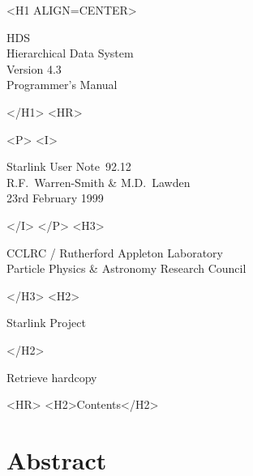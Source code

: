 \documentclass[twoside,11pt]{article}
\newcommand{\stardoccategory}  {Starlink User Note}
\newcommand{\stardocsource}    {sun\stardocnumber}
\newcommand{\stardocnumber}    {92.12}
\newcommand{\stardocauthors}   {R.F.~Warren-Smith \& M.D.~Lawden}
\newcommand{\stardocdate}      {23rd February 1999}
\newcommand{\stardoctitle}     {HDS\\ [\latex{1ex}]
                                Hierarchical Data System}
\newcommand{\stardocversion}   {Version 4.3}
\newcommand{\stardocmanual}    {Programmer's Manual}
\newcommand{\htmladdnormallink}[2]{#1}
\newcommand{\htmladdimg}[1]{}
\newcommand{\htmlref}[2]{#1}
\newcommand{\htmladdtonavigation}[1]{}
\newcommand{\latex}[1]{#1}
\newcommand{\xlabel}[1]{}
\renewcommand{\_}{\texttt{\symbol{95}}}
\begin{document}
\begin{htmlonly}
   \xlabel{}
   \begin{rawhtml} <H1 ALIGN=CENTER> \end{rawhtml}
      \stardoctitle\\
      \stardocversion\\
      \stardocmanual
   \begin{rawhtml} </H1> <HR> \end{rawhtml}


   \begin{rawhtml} <P> <I> \end{rawhtml}
   \stardoccategory\ \stardocnumber \\
   \stardocauthors \\
   \stardocdate
   \begin{rawhtml} </I> </P> <H3> \end{rawhtml}
      \htmladdnormallink{CCLRC / Rutherford Appleton Laboratory}
                        {http://www.cclrc.ac.uk} \\
      \htmladdnormallink{Particle Physics \& Astronomy Research Council}
                        {http://www.pparc.ac.uk} \\
   \begin{rawhtml} </H3> <H2> \end{rawhtml}
      \htmladdnormallink{Starlink Project}{http://www.starlink.ac.uk/}
   \begin{rawhtml} </H2> \end{rawhtml}
   \htmladdnormallink{\htmladdimg{source.gif} Retrieve hardcopy}
      {http://www.starlink.ac.uk/cgi-bin/hcserver?\stardocsource}\\

  \label{stardoccontents}
  \begin{rawhtml}
    <HR>
    <H2>Contents</H2>
  \end{rawhtml}
  \htmladdtonavigation{\htmlref{\htmladdimg{contents_motif.gif}}
        {stardoccontents}}

  \section{\xlabel{abstract}Abstract}
\end{htmlonly}
\end{document}
